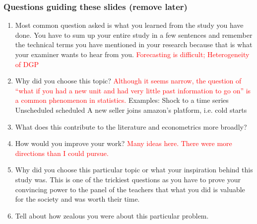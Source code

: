 \documentclass[9pt]{beamer}
\theoremstyle{definition}
\begin{document}
\begin{frame}
    \frametitle{Questions guiding these slides (remove later)}
    \begin{enumerate}
        \item Most common question asked is what you learned from the
        study you have done. You have to sum up your entire study in a few sentences and remember the technical terms you have mentioned in your research because that is what your examiner wants to hear from you.
        \textcolor{red}{Forecasting is difficult; Heterogeneity of DGP}
        \item Why did you choose this topic?
        \textcolor{red}{Although it seems narrow, the question of “what if you had a new unit and had very little past information to go on” is a common phenomenon in statistics.}
        Examples:
        Shock to a time series
        Unscheduled
        scheduled
        A new seller joins amazon’s platform, i.e. cold starts \parencite[][]{fatemi2023mitigating}
        \item What does this contribute to the literature and econometrics more broadly? \textcolor{red}{}
        \item  How would you improve your work? \textcolor{red}{Many ideas here.  There were more directions than I could pursue.}  
\item Why did you choose this particular topic or what your inspiration behind this study was. This is one of the trickiest
questions as you have to prove your convincing power to the panel of the
teachers that what you did is valuable for the society and was worth their time.
\item Tell about how zealous you were about this particular problem.

    \end{enumerate}
    \end{frame}
\end{document}
